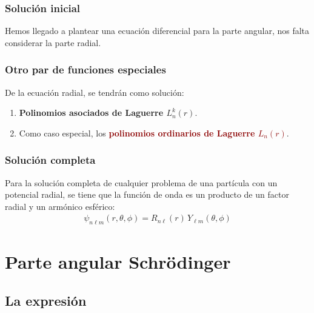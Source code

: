 \documentclass[12pt]{beamer}
\begin{document}
\begin{frame}
\frametitle{Solución inicial}
Hemos llegado a plantear una ecuación diferencial para la parte angular, \pause nos falta considerar la parte radial.
\end{frame}
\begin{frame}
\frametitle{Otro par de funciones especiales}
De  la ecuación radial, se tendrán como solución:
\begin{enumerate}[<+->]
\item \textbf{\textcolor{bole}{Polinomios asociados de Laguerre $L_{n}^{k} (r)$}}.
\item Como caso especial, los \textbf{\textcolor{darkred}{polinomios ordinarios de Laguerre $L_{n} (r)$}}.
\end{enumerate}
\end{frame}
\begin{frame}
\frametitle{Solución completa}
Para la solución completa de cualquier problema de una partícula con un potencial radial, se tiene que la función de onda es un producto de un factor radial y un armónico esférico:
\pause
\begin{align*}
\psi_{n \ell m} (r, \theta, \phi) = R_{n \ell} (r) \, Y_{\ell m} (\theta, \phi)
\end{align*}
\end{frame}

\section{Parte angular Schrödinger}
\subsection{La expresión}
\end{document}
